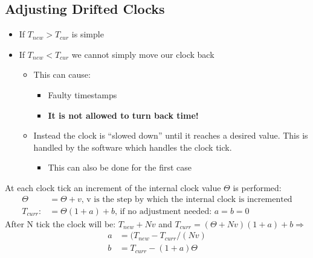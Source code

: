 \documentclass[a4paper]{article}
\begin{document}
\subsection{Adjusting Drifted Clocks}
\begin{itemize}
		\item If $T_{new} > T_{cur}$ is simple
		\item If $T_{new} < T_{cur}$ we cannot simply move our clock back
				\begin{itemize}
						\item This can cause:
								\begin{itemize}
										\item Faulty timestamps
										\item \textbf{It is not allowed to turn
												back time!}
								\end{itemize}
						\item Instead the clock is ``slowed down'' until it
								reaches a desired value. This is handled by the
								software which handles the clock tick.
								\begin{itemize}
										\item This can also be done for the
												first case
								\end{itemize}
				\end{itemize}
\end{itemize}
At each clock tick an increment of the internal clock value $\Theta$ is
performed:
\begin{align*}
		\Theta&=\Theta+v \mbox{, v is the step by which the internal clock is
		incremented}\\
		T_{curr}:&=\Theta(1+a)+b  \mbox{, if no adjustment needed: } a=b=0
\end{align*}
After N tick the clock will be: $T_{new}+Nv$ and $T_{curr}=(\Theta +Nv)(1+a)+b
\Rightarrow$
\begin{align*}
		a&=(T_{new} - T_{curr}/(Nv)\\
		b&=T_{curr} - (1+a)\Theta
\end{align*}
\end{document}
